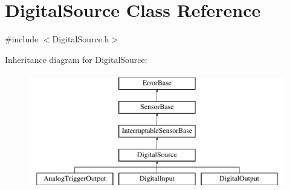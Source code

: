\hypertarget{classDigitalSource}{
\section{DigitalSource Class Reference}
\label{classDigitalSource}
}


{\ttfamily \#include $<$DigitalSource.h$>$}

Inheritance diagram for DigitalSource:\begin{figure}[H]
\begin{center}
\leavevmode
\includegraphics[height=5.000000cm]{classDigitalSource}
\end{center}
\end{figure}
